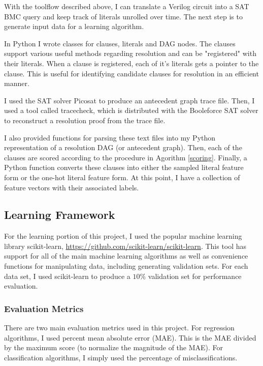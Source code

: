 \documentclass[letterpaper]{article} %
\begin{document}
With the toolflow described above, I can translate a Verilog circuit into a SAT BMC query and keep track of literals unrolled over time. The next step is to generate input data for a learning algorithm.

In Python I wrote classes for clauses, literals and DAG nodes. The clauses support various useful methods regarding resolution and can be "registered" with their literals. When a clause is registered, each of it's literals gets a pointer to the clause. This is useful for identifying candidate clauses for resolution in an efficient manner. 

I used the SAT solver Picosat to produce an antecedent graph trace file. Then, I used a tool called tracecheck, which is distributed with the Booleforce SAT solver to reconstruct a resolution proof from the trace file. 

I also provided functions for parsing these text files into my Python representation of a resolution DAG (or antecedent graph). Then, each of the clauses are scored according to the procedure in Agorithm \ref{scoring}. Finally, a Python function converts these clauses into either the sampled literal feature form or the one-hot literal feature form. At this point, I have a collection of feature vectors with their associated labels.

\subsection{Learning Framework}

For the learning portion of this project, I used the popular machine learning library scikit-learn, \url{https://github.com/scikit-learn/scikit-learn}.  This tool has support for all of the main machine learning algorithms as well as convenience functions for manipulating data, including generating validation sets. For each data set, I used scikit-learn to produce a $10\%$ validation set for performance evaluation.

\subsubsection{Evaluation Metrics}

There are two main evaluation metrics used in this project. For regression algorithms, I used percent mean absolute error (MAE). This is the MAE divided by the maximum score (to normalize the magnitude of the MAE). For classification algorithms, I simply used the percentage of misclassifications.
\end{document}
